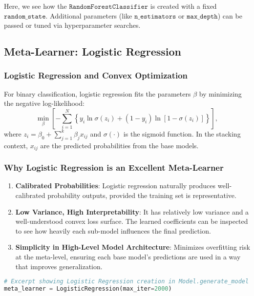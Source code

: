 \documentclass[12pt]{article}
\begin{document}
\noindent Here, we see how the \(\texttt{RandomForestClassifier}\) is created with a fixed \(\texttt{random\_state}\). Additional parameters (like \(\texttt{n\_estimators}\) or \(\texttt{max\_depth}\)) can be passed or tuned via hyperparameter searches.

\subsection{Meta-Learner: Logistic Regression}

\subsubsection{Logistic Regression and Convex Optimization}
For binary classification, logistic regression fits the parameters \(\beta\) by minimizing the negative log-likelihood:
\[
\min_{\beta} \left[ -\sum_{i=1}^N \left\{ y_i \ln \sigma(z_i) + (1 - y_i)\ln [1 - \sigma(z_i)] \right\} \right],
\]
where \(z_i = \beta_0 + \sum_{j=1}^k \beta_j x_{ij}\) and \(\sigma(\cdot)\) is the sigmoid function. In the stacking context, \(x_{ij}\) are the predicted probabilities from the base models.

\subsubsection{Why Logistic Regression is an Excellent Meta-Learner}
\begin{enumerate}[label=\arabic*)]
    \item \textbf{Calibrated Probabilities}: Logistic regression naturally produces well-calibrated probability outputs, provided the training set is representative.
    \item \textbf{Low Variance, High Interpretability}: It has relatively low variance and a well-understood convex loss surface. The learned coefficients can be inspected to see how heavily each sub-model influences the final prediction.
    \item \textbf{Simplicity in High-Level Model Architecture}: Minimizes overfitting risk at the meta-level, ensuring each base model’s predictions are used in a way that improves generalization.
\end{enumerate}

\begin{lstlisting}[language=Python]
# Excerpt showing Logistic Regression creation in Model.generate_model
meta_learner = LogisticRegression(max_iter=2000)
\end{lstlisting}
\end{document}
